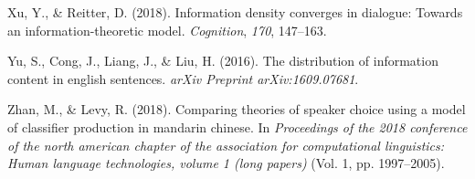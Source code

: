\documentclass[10pt, letterpaper]{article}
\begin{document}
\leavevmode\hypertarget{ref-xu2018}{}%
Xu, Y., \& Reitter, D. (2018). Information density converges in
dialogue: Towards an information-theoretic model. \emph{Cognition},
\emph{170}, 147--163.

\leavevmode\hypertarget{ref-yu2016}{}%
Yu, S., Cong, J., Liang, J., \& Liu, H. (2016). The distribution of
information content in english sentences. \emph{arXiv Preprint
arXiv:1609.07681}.

\leavevmode\hypertarget{ref-zhan2018}{}%
Zhan, M., \& Levy, R. (2018). Comparing theories of speaker choice using
a model of classifier production in mandarin chinese. In
\emph{Proceedings of the 2018 conference of the north american chapter
of the association for computational linguistics: Human language
technologies, volume 1 (long papers)} (Vol. 1, pp. 1997--2005).


\end{document}
